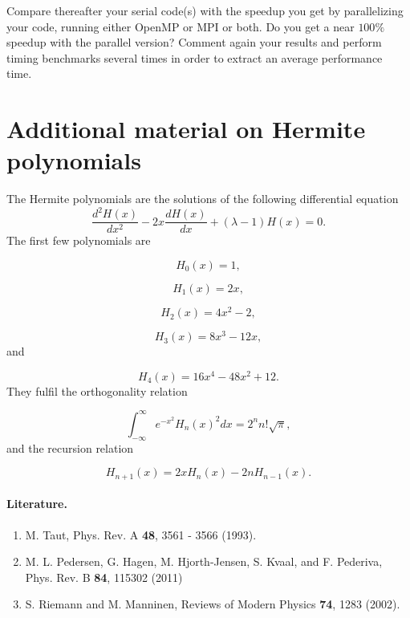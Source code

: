 \documentclass[%
oneside,                 %
final,                   %
10pt]{article}
\begin{document}
Compare thereafter your serial code(s)  with the speedup you get by parallelizing your code, running either OpenMP or MPI or both.
Do you get a near $100\%$ speedup with the parallel version? Comment again your results and perform timing benchmarks several times in order 
to extract  an average performance time. 

\section{Additional material on Hermite polynomials}

The Hermite polynomials are the solutions of the following differential
equation
\begin{equation}
   \frac{d^2H(x)}{dx^2}-2x\frac{dH(x)}{dx}+
       (\lambda-1)H(x)=0.
   \label{eq:hermite}
\end{equation}
The first few polynomials are

\begin{equation*}
   H_0(x)=1,
\end{equation*}

\begin{equation*}
    H_1(x)=2x,
\end{equation*}

\begin{equation*}
    H_2(x)=4x^2-2,
\end{equation*}

\begin{equation*}
    H_3(x)=8x^3-12x,
\end{equation*}
and

\begin{equation*}
    H_4(x)=16x^4-48x^2+12.
\end{equation*}
They fulfil the orthogonality relation

\begin{equation*}
  \int_{-\infty}^{\infty}e^{-x^2}H_n(x)^2dx=2^nn!\sqrt{\pi},
\end{equation*}
and the recursion relation

\begin{equation*}
  H_{n+1}(x)=2xH_{n}(x)-2nH_{n-1}(x).
\end{equation*}

\paragraph{Literature.}
\begin{enumerate}
 \item M. Taut, Phys. Rev. A \textbf{48}, 3561 - 3566 (1993).

 \item M. L. Pedersen, G. Hagen, M. Hjorth-Jensen, S. Kvaal,  and F. Pederiva, Phys. Rev. B \textbf{84}, 115302 (2011)

 \item S. Riemann and M. Manninen, Reviews of Modern Physics \textbf{74}, 1283 (2002). 
\end{enumerate}
\end{document}
